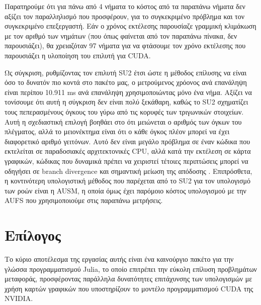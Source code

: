 Παρατηρούμε ότι για πάνω από 4 νήματα το κόστος από τα παραπάνω νήματα δεν αξίζει τον παραλληλισμό που προσφέρουν, για το συγκεκριμένο πρόβλημα και τον συγκεκριμένο επεξεργαστή.
Εάν ο χρόνος εκτέλεσης παρουσίαζε γραμμική κλιμάκωση με τον αριθμό των νημάτων (που όπως φαίνεται από τον παραπάνω πίνακα, δεν παρουσιάζει), θα χρειαζόταν 97 νήματα για να φτάσουμε τον χρόνο εκτέλεσης που παρουσιάζει η υλοποίηση του επιλυτή για CUDA.

Ως σύγκριση, ρυθμίζοντας τον επιλυτή SU2 έτσι ώστε η μέθοδος επίλυσης να είναι όσο το δυνατόν πιο κοντά στο πακέτο μας, ο μετρούμενος χρόονος ανά επανάληψη είναι περίπου 10.911 ms ανά επανάληψη χρησιμοποιώντας μόνο ένα νήμα.
Αξίζει να τονίσουμε ότι αυτή η σύγκριση δεν είναι πολύ ξεκάθαρη, καθώς το SU2 σχηματίζει τους πεπερασμένους όγκους του γύρω από τις κορυφές των τριγωνικών στοιχείων.
Αυτή η σχεδιαστική επιλογή βοηθάει στο ότι μειώνεται ο αριθμός των όγκων του πλέγματος, αλλά το μειονέκτημα είναι ότι ο κάθε όγκος πλέον μπορεί να έχει διαφορετικό αριθμό γειτόνων.
Αυτό δεν είναι μεγάλο πρόβλημα σε έναν κώδικα που εκτελείται σε παραδοσιακές αρχιτεκτονικές CPU, αλλά κατά την εκτέλεση σε κάρτα γραφικών, κώδικας που δυναμικά πρέπει να χειριστεί τέτοιες περιπτώσεις μπορεί να οδηγήσει σε branch divergence και σημαντική μείωση της απόδοσης \cite{Patterson2017}.
Επιπρόσθετα, η κοντινότερη υπολογιστική μέθοδος που παρέχεται από το SU2 για τον υπολογισμό των ροών είναι η AUSM, η οποία όμως έχει παρόμοιο κόστος υπολογισμού με την AUFS που χρησιμοποιούμε στις παραπάνω μετρήσεις.

\section{Επίλογος}

Το κύριο αποτέλεσμα της εργασίας αυτής είναι ένα καινούργιο πακέτο για την γλώσσα προγραμματισμού Julia, το οποίο επιτρέπει την εύκολη επίλυση προβλημάτων μεταφοράς, προσφέροντας παράλληλα δυνατότητες επιτάχυνσης των υπολογισμών με χρήση καρτών γραφικών που υποστηρίζουν το μοντέλο προγραμματισμού CUDA της NVIDIA.

